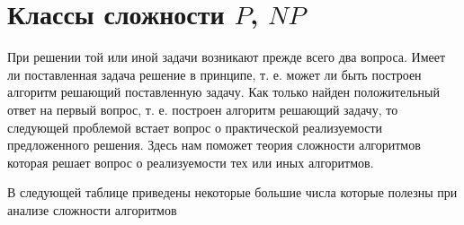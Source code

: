 \section{Классы сложности $P$, $NP$}

При решении той или иной задачи возникают прежде всего два
вопроса. Имеет ли поставленная задача решение в принципе, т. е. может ли быть
построен алгоритм решающий поставленную задачу. Как только найден
положительный ответ на первый вопрос, т. е. построен алгоритм решающий
задачу, то следующей проблемой встает вопрос о практической
реализуемости предложенного решения. Здесь нам поможет теория
сложности алгоритмов которая решает вопрос о реализуемости тех или
иных алгоритмов. 

В следующей таблице \cite{bSchneier} 
приведены некоторые большие числа
которые полезны при анализе сложности алгоритмов
